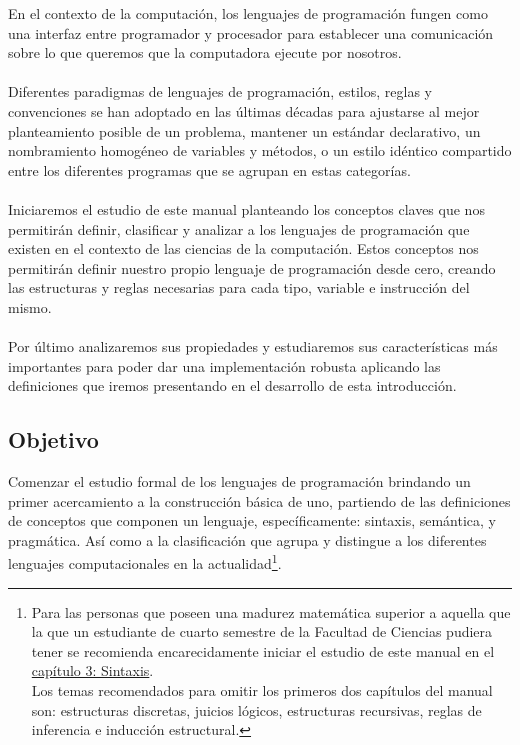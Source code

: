 En el contexto de la computación, los lenguajes de programación fungen como una interfaz entre programador y procesador para establecer una comunicación sobre lo que queremos que la computadora ejecute por nosotros.\\\\
Diferentes paradigmas de lenguajes de programación, estilos, reglas y convenciones se han adoptado en las últimas décadas para ajustarse al mejor planteamiento posible de un problema, mantener un estándar declarativo, un nombramiento homogéneo de variables y métodos, o un estilo idéntico compartido entre los diferentes programas que se agrupan en estas categorías.\\\\
Iniciaremos el estudio de este manual planteando los conceptos claves que nos permitirán definir, clasificar y analizar a los lenguajes de programación que existen en el contexto de las ciencias de la computación. Estos conceptos nos permitirán definir nuestro propio lenguaje de programación desde cero, creando las estructuras y reglas necesarias para cada tipo, variable e instrucción del mismo.\\\\
Por último analizaremos sus propiedades y estudiaremos sus características más importantes para poder dar una implementación robusta aplicando las definiciones que iremos presentando en el desarrollo de esta introducción.\\

\subsection*{Objetivo}
    Comenzar el estudio formal de los lenguajes de programación brindando un primer acercamiento a la construcción básica de uno, partiendo de las definiciones de conceptos que componen un lenguaje, específicamente: sintaxis, semántica, y pragmática. Así como a la clasificación que agrupa y distingue a los diferentes lenguajes computacionales en la actualidad\footnote{Para las personas que poseen una madurez matemática superior a aquella que la que un estudiante de cuarto semestre de la Facultad de Ciencias pudiera tener se recomienda encarecidamente iniciar el estudio de este manual en el \hyperref[sec:sintax]{capítulo 3: Sintaxis}.\\ Los temas recomendados para omitir los primeros dos capítulos del manual son: estructuras discretas, juicios lógicos, estructuras recursivas, reglas de inferencia e inducción estructural. }.

